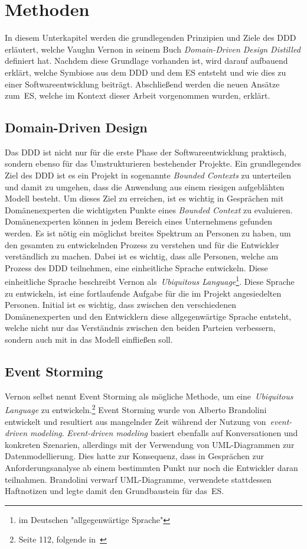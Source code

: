 \section{Methoden}\label{sec:event-storming}
In diesem Unterkapitel werden die grundlegenden Prinzipien und Ziele des \ac{DDD} erläutert, welche Vaughn Vernon in seinem Buch
\textit{Domain-Driven Design Distilled} definiert hat\cite*{dddd}.
Nachdem diese Grundlage vorhanden ist, wird darauf aufbauend erklärt, welche Symbiose aus dem \ac{DDD} und dem \ac{ES} entsteht und wie
dies zu einer Softwareentwicklung beiträgt.
Abschließend werden die neuen Ansätze zum~\ac{ES}, welche im Kontext dieser Arbeit vorgenommen wurden, erklärt.

\subsection{Domain-Driven Design}\label{subsec:domain-driven-design}
Das \ac*{DDD} ist nicht nur für die erste Phase der Softwareentwicklung praktisch, sondern ebenso für das Umstrukturieren bestehender Projekte.
Ein grundlegendes Ziel des \ac{DDD} ist es ein Projekt in sogenannte \textit{Bounded Contexts} zu unterteilen und damit zu umgehen, dass
die Anwendung aus einem riesigen aufgeblähten Modell besteht.
Um dieses Ziel zu erreichen, ist es wichtig in Gesprächen mit Domänenexperten die wichtigsten Punkte eines \textit{Bounded Context} zu evaluieren.
Domänenexperten können in jedem Bereich eines Unternehmens gefunden werden.
Es ist nötig ein möglichst breites Spektrum an Personen zu haben, um den gesamten zu entwickelnden Prozess zu verstehen und für die Entwickler verständlich zu machen.
Dabei ist es wichtig, dass alle Personen, welche am Prozess des \ac{DDD} teilnehmen, eine einheitliche Sprache entwickeln.
Diese einheitliche Sprache beschreibt Vernon als~\textit{Ubiquitous Language}\footnote{im Deutschen "allgegenwärtige Sprache"}\cite*{dddd}.
Diese Sprache zu entwickeln, ist eine fortlaufende Aufgabe für die im Projekt angesiedelten Personen.
Initial ist es wichtig, dass zwischen den verschiedenen Domänenexperten und den Entwicklern diese allgegenwärtige Sprache entsteht, welche
nicht nur das Verständnis zwischen den beiden Parteien verbessern, sondern auch mit in das Modell einfließen soll.

\subsection{Event Storming}\label{subsec:allgemein}
Vernon selbst nennt Event Storming als mögliche Methode, um eine~\textit{Ubiquitous Language} zu entwickeln.\footnote{Seite 112, folgende in~\cite*{dddd}}
Event Storming wurde von Alberto Brandolini entwickelt und resultiert aus mangelnder Zeit während der Nutzung von~\textit{event-driven modeling}.
\textit{Event-driven modeling} basiert ebenfalls auf Konversationen und konkreten Szenarien, allerdings mit der Verwendung von UML-Diagrammen zur Datenmodellierung.
Dies hatte zur Konsequenz, dass in Gesprächen zur Anforderungsanalyse ab einem bestimmten Punkt nur noch die Entwickler daran teilnahmen.
Brandolini verwarf UML-Diagramme, verwendete stattdessen Haftnotizen und legte damit den Grundbaustein für das~\ac{ES}\cite*{dddd}.

